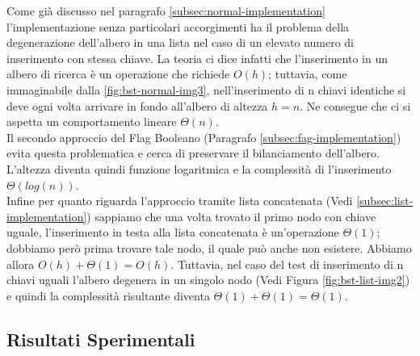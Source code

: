 \documentclass{article}
\begin{document}
Come già discusso nel paragrafo \ref{subsec:normal-implementation} l'implementazione senza particolari accorgimenti ha il problema della degenerazione dell'albero in una lista nel caso di un elevato numero di inserimento con stessa chiave.
La teoria ci dice infatti che l'inserimento in un albero di ricerca è un operazione che richiede $O(h)$; tuttavia, come immaginabile dalla \cref{fig:bst-normal-img3}, nell'inserimento di n chiavi identiche si deve ogni volta arrivare in fondo all'albero di altezza $h=n$. Ne consegue che ci si aspetta un comportamento lineare $\Theta(n)$.
\\
Il secondo approccio del Flag Booleano (Paragrafo \ref{subsec:fag-implementation}) evita questa problematica e cerca di preservare il bilanciamento dell'albero. L'altezza diventa quindi funzione logaritmica e la complessità di l'inserimento $\Theta(log(n))$.
\\
Infine per quanto riguarda l'approccio tramite lista concatenata (Vedi \ref{subsec:list-implementation}) sappiamo che una volta trovato il primo nodo con chiave uguale, l'inserimento in testa alla lista concatenata è un'operazione $\Theta(1)$; dobbiamo però prima trovare tale nodo, il quale può anche non esistere. Abbiamo allora $O(h) + \Theta(1) = O(h)$. 
Tuttavia, nel caso del test di inserimento di n chiavi uguali l'albero degenera in un singolo nodo (Vedi Figura \ref{fig:bst-list-img2}) e quindi la complessità risultante diventa $\Theta(1) + \Theta(1) = \Theta(1)$.


\subsection{Risultati Sperimentali}
\end{document}
